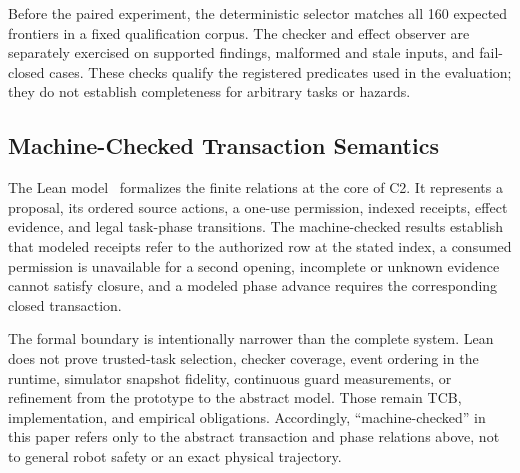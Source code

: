 Before the paired experiment, the deterministic selector matches all 160
expected frontiers in a fixed qualification corpus.  The checker and effect
observer are separately exercised on supported findings, malformed and stale
inputs, and fail-closed cases.  These checks qualify the registered predicates
used in the evaluation; they do not establish completeness for arbitrary tasks
or hazards.

\subsection{Machine-Checked Transaction Semantics}

The Lean model~\cite{lean4} formalizes the finite relations at the core of C2.
It represents a proposal, its ordered source actions, a one-use permission,
indexed receipts, effect evidence, and legal task-phase transitions.  The
machine-checked results establish that modeled receipts refer to the authorized
row at the stated index, a consumed permission is unavailable for a second
opening, incomplete or unknown evidence cannot satisfy closure, and a modeled
phase advance requires the corresponding closed transaction.

The formal boundary is intentionally narrower than the complete system.  Lean
does not prove trusted-task selection, checker coverage, event ordering in the
runtime, simulator snapshot fidelity, continuous guard measurements, or
refinement from the prototype to the abstract model.  Those remain TCB,
implementation, and empirical obligations.  Accordingly, ``machine-checked'' in
this paper refers only to the abstract transaction and phase relations above,
not to general robot safety or an exact physical trajectory.
